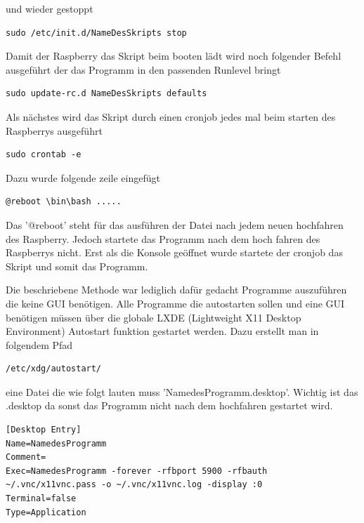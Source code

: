 \documentclass[11pt,a4paper]{article} %
\begin{document}
und wieder gestoppt
\begin{frame}

\begin{lstlisting}
sudo /etc/init.d/NameDesSkripts stop
\end{lstlisting}
\end{frame}

Damit der Raspberry das Skript beim booten l\"adt wird noch folgender Befehl ausgef\"uhrt der das Programm in den passenden Runlevel bringt
\begin{frame}

\begin{lstlisting}
sudo update-rc.d NameDesSkripts defaults
\end{lstlisting}
\end{frame}
\par

Als n\"achstes wird das Skript durch einen cronjob jedes mal beim starten des Raspberrys ausgef\"uhrt
\begin{frame}

\begin{lstlisting}
sudo crontab -e
\end{lstlisting}
\end{frame}
\newpage
Dazu wurde folgende zeile eingef\"ugt
\begin{frame}

\begin{lstlisting}
@reboot \bin\bash .....
\end{lstlisting}
\end{frame}
Das '@reboot' steht f\"ur das ausf\"uhren der Datei nach jedem neuen hochfahren des Raspberry. Jedoch startete das Programm nach dem hoch fahren des Raspberrys nicht. Erst als die Konsole ge\"offnet wurde startete der cronjob das Skript und somit das Programm.
\par
Die beschriebene Methode war lediglich daf\"ur gedacht Programme auszuf\"uhren die keine GUI ben\"otigen. Alle Programme die autostarten sollen und eine GUI ben\"otigen m\"ussen \"uber die globale LXDE (Lightweight X11 Desktop Environment) Autostart funktion gestartet werden.
Dazu erstellt man in folgendem Pfad
\begin{frame}

\begin{lstlisting}
/etc/xdg/autostart/
\end{lstlisting}
\end{frame}
eine Datei die wie folgt lauten muss 'NamedesProgramm.desktop'. Wichtig ist das .desktop da sonst das Programm nicht nach dem hochfahren gestartet wird.
\begin{frame}

\begin{lstlisting}
[Desktop Entry]
Name=NamedesProgramm
Comment=
Exec=NamedesProgramm -forever -rfbport 5900 -rfbauth ~/.vnc/x11vnc.pass -o ~/.vnc/x11vnc.log -display :0
Terminal=false
Type=Application
\end{lstlisting}
\end{frame}
\end{document}
